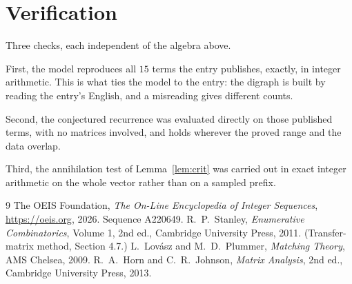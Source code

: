 \documentclass[11pt,a4paper]{article}
\theoremstyle{plain}
\theoremstyle{definition}
\begin{document}
\section{Verification}

Three checks, each independent of the algebra above.

First, the model reproduces all $15$ terms the entry publishes, exactly, in integer
arithmetic. This is what ties the model to the entry: the digraph is built by reading the
entry's English, and a misreading gives different counts.

Second, the conjectured recurrence was evaluated directly on those published terms, with no
matrices involved, and holds wherever the proved range and the data overlap.

Third, the annihilation test of Lemma~\ref{lem:crit} was carried out in exact integer
arithmetic on the whole vector rather than on a sampled prefix.

\begin{thebibliography}{9}
 The OEIS Foundation, \emph{The On-Line Encyclopedia of Integer
Sequences}, \url{https://oeis.org}, 2026. Sequence A220649.
 R.~P.~Stanley, \emph{Enumerative Combinatorics}, Volume 1, 2nd ed.,
Cambridge University Press, 2011. (Transfer-matrix method, Section 4.7.)
 L.~Lov\'asz and M.~D.~Plummer, \emph{Matching Theory}, AMS Chelsea,
2009.
 R.~A.~Horn and C.~R.~Johnson, \emph{Matrix Analysis}, 2nd ed., Cambridge
University Press, 2013.
\end{thebibliography}
\end{document}
